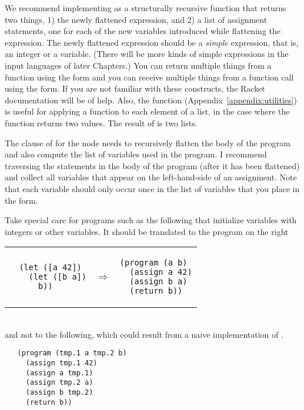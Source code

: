 \documentclass[11pt]{book}
\begin{document}
We recommend implementing  as a structurally recursive
function that returns two things, 1) the newly flattened expression,
and 2) a list of assignment statements, one for each of the new
variables introduced while flattening the expression.  The newly
flattened expression should be a \emph{simple} expression, that is, an
integer or a variable. (There will be more kinds of simple expressions
in the input languages of later Chapters.) You can return multiple
things from a function using the  form and you can receive
multiple things from a function call using the 
form. If you are not familiar with these constructs, the Racket
documentation will be of help. Also, the  function
(Appendix~\ref{appendix:utilities}) is useful for applying a function
to each element of a list, in the case where the function returns two
values. The result of  is two lists.

The clause of  for the  node needs to
recursively flatten the body of the program and also compute the list
of variables used in the program.  I recommend traversing the
statements in the body of the program (after it has been flattened)
and collect all variables that appear on the left-hand-side of an
assignment. Note that each variable should only occur once in the list
of variables that you place in the  form.

Take special care for programs such as the following that initialize
variables with integers or other variables. It should be translated
to the program on the right \\
\begin{tabular}{lll}
\begin{minipage}{0.4\textwidth}
\begin{lstlisting}
  (let ([a 42])
    (let ([b a])
      b))
\end{lstlisting}
\end{minipage}
&
$\Rightarrow$
&
\begin{minipage}{0.4\textwidth}
\begin{lstlisting}
(program (a b)
  (assign a 42)
  (assign b a)
  (return b))
\end{lstlisting}
\end{minipage}
\end{tabular} \\
and not to the following, which could result from a naive
implementation of .
\begin{lstlisting}
   (program (tmp.1 a tmp.2 b)
     (assign tmp.1 42)
     (assign a tmp.1)
     (assign tmp.2 a)
     (assign b tmp.2)
     (return b))
\end{lstlisting}
\end{document}

